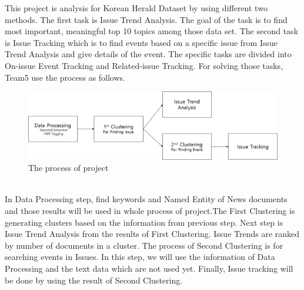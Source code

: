 This project is analysis for Korean Herald Dataset by using different two methods. The first task is Issue Trend Analysis. The goal of the task is to find most important, meaningful top 10 topics among those data set. The second task is Issue Tracking which is to find events based on a specific issue from Issue Trend Analysis and give details of the event. The specific tasks are divided into On-issue Event Tracking and Related-issue Tracking. For solving those tasks, Team5 use the process as follows.
\begin{figure}[htp]
    \centering            
    \includegraphics[width=\textwidth]{01_introduction.png} 
    \caption{The process of project} 
    \label{fig:introduction} 
\end{figure}\\
In Data Processing step, find keywords and Named Entity of News documents and those results will be used in whole process of project.The First Clustering is generating clusters based on the information from previous step. Next step is Issue Trend Analysis from the results of First Clustering. Issue Trends are ranked by number of documents in a cluster. The process of Second Clustering is for searching events in Issues. In this step, we will use the information of Data Processing and the text data which are not used yet. Finally, Issue tracking will be done by using the result of Second Clustering.